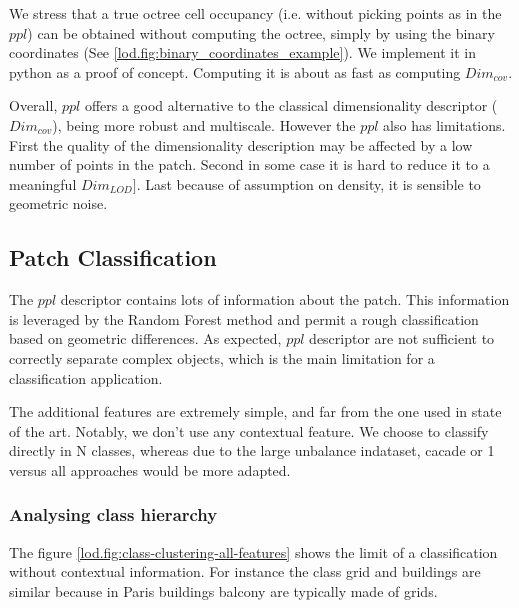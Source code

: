 		We stress that a true octree cell occupancy (i.e. without picking points as in the $ppl$) can be obtained without computing the octree, simply by using the binary coordinates (See \ref{lod.fig:binary_coordinates_example}).
		We implement it in python as a proof of concept. Computing it is about as fast as computing $Dim_{cov}$.
		
		Overall, $ppl$ offers a good alternative to the classical dimensionality descriptor ($Dim_{cov}$), being more robust and multiscale. 
		However the $ppl$ also has limitations. 
		First the quality of the dimensionality description may be affected by a low number of points in the patch. 
		Second in some case it is hard to reduce it to a meaningful $Dim_{LOD}]$.
		Last because of assumption on density, it is sensible to geometric noise.
			  
	\subsection{Patch Classification}
		The $ppl$ descriptor contains lots of information about the patch. This information is leveraged by the Random Forest method and permit a rough classification based on geometric differences.
		As expected, $ppl$ descriptor are  not sufficient to correctly separate complex objects,
		which is the main limitation for a classification application. 
		
		The additional features are extremely simple, and far from the one used in state of the art.
		Notably, we don't use any contextual feature.
		We choose to classify directly in N classes, whereas due to the large unbalance indataset, cacade or 1 versus all approaches would be more adapted.
		
	\subsubsection{Analysing class hierarchy} 
		The figure \ref{lod.fig:class-clustering-all-features} shows the limit of a classification without contextual information. For instance the class grid and buildings are similar because in Paris buildings balcony are typically made of grids.
		
